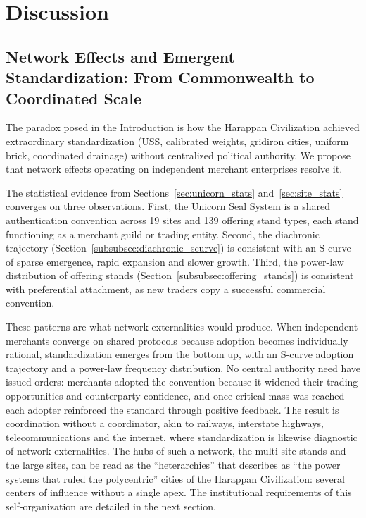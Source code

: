 \documentclass[12pt]{article}
\begin{document}
\section{Discussion}

\subsection{Network Effects and Emergent Standardization: From 
Commonwealth to Coordinated Scale}

The paradox posed in the Introduction is how the Harappan Civilization achieved
extraordinary standardization (USS, calibrated weights, gridiron cities, uniform
brick, coordinated drainage) without centralized political authority. We propose
that network effects operating on independent merchant enterprises resolve it.

The statistical evidence from Sections~\ref{sec:unicorn_stats}
and~\ref{sec:site_stats} converges on three observations. First, the Unicorn Seal
System is a shared authentication convention across 19 sites and 139 offering
stand types, each stand functioning as a merchant guild or trading entity. Second,
the diachronic trajectory (Section~\ref{subsubsec:diachronic_scurve}) is
consistent with an S-curve of sparse emergence, rapid expansion and slower growth.
Third, the power-law distribution of offering stands
(Section~\ref{subsubsec:offering_stands}) is consistent with preferential
attachment, as new traders copy a successful commercial convention.

These patterns are what network externalities would produce. When independent
merchants converge on shared protocols because adoption becomes individually
rational, standardization emerges from the bottom up, with an S-curve adoption
trajectory and a power-law frequency distribution. No central authority need have
issued orders: merchants adopted the convention because it widened their trading
opportunities and counterparty confidence, and once critical mass was reached each
adopter reinforced the standard through positive feedback. The result is
coordination without a coordinator, akin to railways, interstate highways,
telecommunications and the internet, where standardization is likewise diagnostic
of network externalities. The hubs of such a network, the multi-site stands and
the large sites, can be read as the ``heterarchies'' that
\citet{vidale2018heterarchic} describes as ``the power systems that ruled the
polycentric'' cities of the Harappan Civilization: several centers of influence
without a single apex. The institutional requirements of this self-organization
are detailed in the next section.
\end{document}

